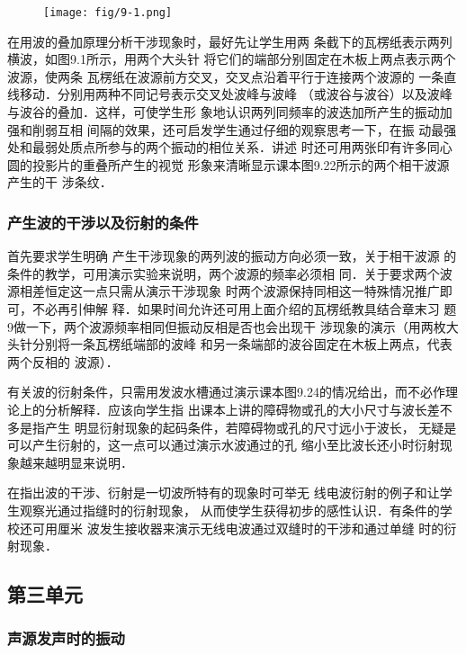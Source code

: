 \begin{figure}[htp]
    \centering
\texttt{[image: fig/9-1.png]}
    \caption{}
\end{figure}

在用波的叠加原理分析干涉现象时，最好先让学生用两
条截下的瓦楞纸表示两列横波，如图9.1所示，用两个大头针
将它们的端部分别固定在木板上两点表示两个波源，使两条
瓦楞纸在波源前方交叉，交叉点沿着平行于连接两个波源的
一条直线移动．分别用两种不同记号表示交叉处波峰与波峰
（或波谷与波谷）以及波峰与波谷的叠加．这样，可使学生形
象地认识两列同频率的波迭加所产生的振动加强和削弱互相
间隔的效果，还可启发学生通过仔细的观察思考一下，在振
动最强处和最弱处质点所参与的两个振动的相位关系．讲述
时还可用两张印有许多同心圆的投影片的重叠所产生的视觉
形象来清晰显示课本图9.22所示的两个相干波源产生的干
涉条纹．

\subsubsection{产生波的干涉以及衍射的条件}

首先要求学生明确
产生干涉现象的两列波的振动方向必须一致，关于相干波源
的条件的教学，可用演示实验来说明，两个波源的频率必须相
同．关于要求两个波源相差恒定这一点只需从演示干涉现象
时两个波源保持同相这一特殊情况推广即可，不必再引伸解
释．如果时间允许还可用上面介绍的瓦楞纸教具结合章末习
题9做一下，两个波源频率相同但振动反相是否也会出现干
涉现象的演示（用两枚大头针分别将一条瓦楞纸端部的波峰
和另一条端部的波谷固定在木板上两点，代表两个反相的
波源）．

有关波的衍射条件，只需用发波水槽通过演示课本图9.24的情况给出，而不必作理论上的分析解释．应该向学生指
出课本上讲的障碍物或孔的大小尺寸与波长差不多是指产生
明显衍射现象的起码条件，若障碍物或孔的尺寸远小于波长，
无疑是可以产生衍射的，这一点可以通过演示水波通过的孔
缩小至比波长还小时衍射现象越来越明显来说明．

在指出波的干涉、衍射是一切波所特有的现象时可举无
线电波衍射的例子和让学生观察光通过指缝时的衍射现象，
从而使学生获得初步的感性认识．有条件的学校还可用厘米
波发生接收器来演示无线电波通过双缝时的干涉和通过单缝
时的衍射现象．

\subsection{第三单元}
\subsubsection{声源发声时的振动}

